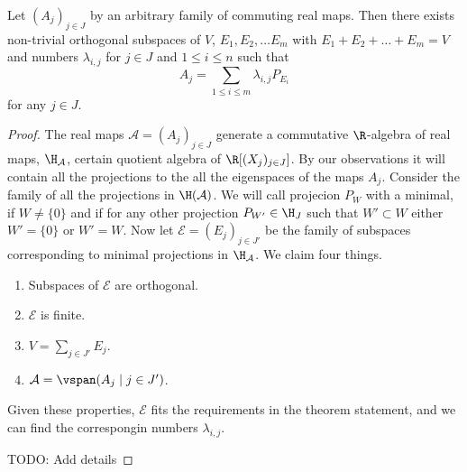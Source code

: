 \begin{lause}
	Let $(A_{j})_{j \in J}$ by an arbitrary family of commuting real maps. Then there exists non-trivial orthogonal subspaces of $V$, $E_{1}, E_{2}, \ldots E_{m}$ with $E_{1} + E_{2} + \ldots + E_{m} = V$ and numbers $\lambda_{i, j}$ for $j \in J$ and $1 \leq i \leq n$ such that
	\[
		A_{j} = \sum_{1 \leq i \leq m} \lambda_{i, j} P_{E_{i}}
	\]
	for any $j \in J$.
\end{lause}
\begin{proof}
	The real maps $\mathcal{A} = (A_{j})_{j \in J}$ generate a commutative $\R$-algebra of real maps, $\H_{\mathcal{A}}$, certain quotient algebra of $\R[(X_{j})_{j \in J}]$. By our observations it will contain all the projections to the all the eigenspaces of the maps $A_{j}$. Consider the family of all the projections in $\H(\mathcal{A})$. We will call projecion $P_{W}$ with a minimal, if $W \neq \{0\}$ and if for any other projection $P_{W'} \in \H_{J}$ such that $W' \subset W$ either $W' = \{0\}$ or $W' = W$. Now let $\mathcal{E} = (E_{j})_{j \in J'}$ be the family of subspaces corresponding to minimal projections in $\H_{\mathcal{A}}$. We claim four things.
	\begin{enumerate}
		\item Subspaces of $\mathcal{E}$ are orthogonal.
		\item $\mathcal{E}$ is finite.
		\item $V = \sum_{j \in J'} E_{j}$.
		\item $\mathcal{A} = \vspan(A_{j} \mid j \in J')$.
	\end{enumerate}
	Given these properties, $\mathcal{E}$ fits the requirements in the theorem statement, and we can find the correspongin numbers $\lambda_{i, j}$.

	TODO: Add details


\end{proof}
